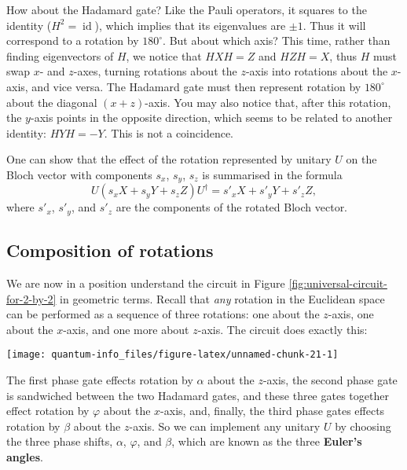\documentclass{article}
\renewcommand{\footnote}[1]{\en{#1}}
\begin{document}
How about the Hadamard gate?
Like the Pauli operators, it squares to the identity (\(H^2=\operatorname{id}\)), which implies that its eigenvalues are \(\pm 1\).
Thus it will correspond to a rotation by \({180}^{\circ}\).
But about which axis?
This time, rather than finding eigenvectors of \(H\), we notice that \(HXH=Z\) and \(HZH=X\), thus \(H\) must swap \(x\)- and \(z\)-axes, turning rotations about the \(z\)-axis into rotations about the \(x\)-axis, and vice versa.
The Hadamard gate must then represent rotation by \({180}^{\circ}\) about the diagonal \((x+z)\)-axis.
You may also notice that, after this rotation, the \(y\)-axis points in the opposite direction, which seems to be related to another identity: \(HYH=-Y\).
This is not a coincidence.

One can show\footnote{Again, see \protect\hyperlink{chapter3}{Chapter 3}.} that the effect of the rotation represented by unitary \(U\) on the Bloch vector with components \(s_x\), \(s_y\), \(s_z\) is summarised in the formula
\[
  U (s_x X + s_y Y + s_z Z) U^\dagger
  = s'_x X+ s'_y Y + s'_z Z,
\]
where \(s'_x\), \(s'_y\), and \(s'_z\) are the components of the rotated Bloch vector.

\hypertarget{composition-of-rotations}{%
\subsection{Composition of rotations}\label{composition-of-rotations}}

We are now in a position understand the circuit in Figure \ref{fig:universal-circuit-for-2-by-2} in geometric terms.
Recall that \emph{any} rotation in the Euclidean space can be performed as a sequence of three rotations: one about the \(z\)-axis, one about the \(x\)-axis, and one more about \(z\)-axis.
The circuit does exactly this:

\begin{center}\texttt{[image: quantum-info\_files/figure-latex/unnamed-chunk-21-1]} \end{center}

The first phase gate effects rotation by \(\alpha\) about the \(z\)-axis, the second phase gate is sandwiched between the two Hadamard gates, and these three gates together effect rotation by \(\varphi\) about the \(x\)-axis, and, finally, the third phase gates effects rotation by \(\beta\) about the \(z\)-axis.
So we can implement any unitary \(U\) by choosing the three phase shifts, \(\alpha\), \(\varphi\), and \(\beta\), which are known as the three \textbf{Euler's angles}.
\end{document}
